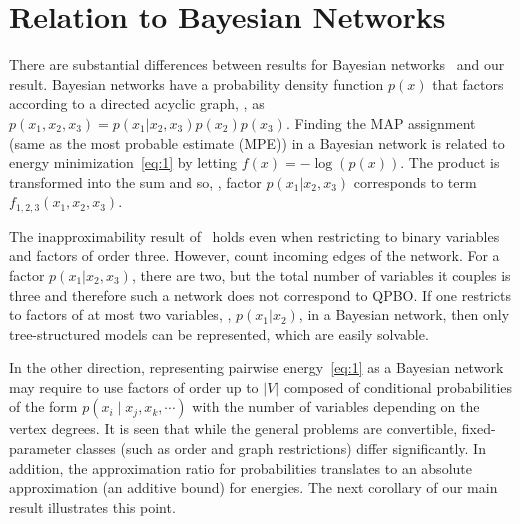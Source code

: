 \section{Relation to Bayesian Networks}\label{sec:BayesNet}
There are substantial differences between results for Bayesian networks~\cite{Abdelbar-98} and our result.
Bayesian networks have a probability density function $p(x)$ that factors according to a directed acyclic graph, \eg, as $p(x_1,x_2,x_3) = p(x_1 | x_2,x_3)p(x_2)p(x_3)$.
Finding the MAP assignment (same as the most probable estimate (MPE)) in a Bayesian network is related to energy minimization~\eqref{eq:1} by letting $f(x) = -\log(p(x))$. The product is transformed into the sum and so, \eg, factor $p(x_1 | x_2,x_3)$ corresponds to term $f_{1,2,3}(x_1,x_2,x_3)$.
\par
The inapproximability result of~\citet{Abdelbar-98} holds even when restricting to binary variables and factors of order three. However, \cite[Section 6.1]{Abdelbar-98} count incoming edges of the network. For a factor $p(x_1 | x_2,x_3)$, there are two, but the total number of variables it couples is three and therefore such a network does not correspond to QPBO. If one restricts to factors of at most two variables, \eg, $p(x_1 | x_2)$, in a Bayesian network, then only tree-structured models can be represented, which are easily solvable. 
\par
In the other direction, representing pairwise energy~\eqref{eq:1} as a Bayesian network may require to use factors of order up to $|V|$ composed of conditional probabilities of the form $p(x_i \mid x_j, x_k, \cdots )$ with the number of variables depending on the vertex degrees. It is seen that while the general problems are convertible, fixed-parameter classes (such as order and graph restrictions) differ significantly. In addition, the approximation ratio for probabilities translates to an absolute approximation (an additive bound) for energies. The next corollary of our main result illustrates this point.


